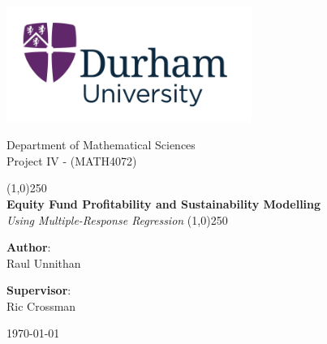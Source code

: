 \documentclass[11pt]{report} %
\begin{document}
\begin{titlepage}
    \begin{center} 
        \hfill \break
         \vspace{5mm}
         
        \includegraphics[width=0.6\textwidth]{Images/Durham_Uni_Name.png}   
       
        \vspace{1cm}
        \LARGE
            Department of Mathematical Sciences \\
            Project IV - (MATH4072)
        
        \linethickness{0.5mm}
        \Huge
            \line(1,0){250}\\
            \textbf{Equity Fund Profitability and Sustainability Modelling}\\

        \vspace{0.3cm}
        \LARGE
        \textit{Using Multiple-Response Regression}  %
        \line(1,0){250}
        \vspace{1cm}
        
    \end{center}  

    \begin{minipage}[t]{0.47\textwidth}\centering
        {\Large \textbf{Author}:\\
        Raul Unnithan}\\
    \end{minipage}
    \hfill
    \begin{minipage}[t]{0.47\textwidth}\centering
        {\Large \textbf{Supervisor}:\\
        Ric Crossman}
    \end{minipage}

    \vfill  %

    \begin{center}
        \large \today  
    \end{center}
    
\end{titlepage}
\end{document}

